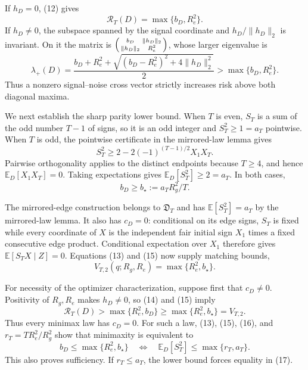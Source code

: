 If \(h_D=0\), (12) gives
\[
\mathcal R_T(D)=\max\{b_D,R_e^2\}.
\tag{13}
\]
If \(h_D\ne0\), the subspace spanned by the signal coordinate and \(h_D/\lVert h_D\rVert_2\) is invariant.  On it the matrix is
\(
\begin{psmallmatrix}b_D&\lVert h_D\rVert_2\\\lVert h_D\rVert_2&R_e^2\end{psmallmatrix}
\), whose larger eigenvalue is
\[
\lambda_+(D)=
\frac{b_D+R_e^2+\sqrt{(b_D-R_e^2)^2+4\lVert h_D\rVert_2^2}}{2}
>\max\{b_D,R_e^2\}.
\tag{14}
\]
Thus a nonzero signal--noise cross vector strictly increases risk above both diagonal maxima.

We next establish the sharp parity lower bound.  When \(T\) is even, \(S_T\) is a sum of the odd number \(T-1\) of signs, so it is an odd integer and \(S_T^2\ge1=a_T\) pointwise.  When \(T\) is odd, the pointwise certificate in the mirrored-law lemma gives
\[
S_T^2\ge2-2(-1)^{(T-1)/2}X_1X_T.
\]
Pairwise orthogonality applies to the distinct endpoints because \(T\ge4\), and hence \(\mathbb E_D[X_1X_T]=0\).  Taking expectations gives \(\mathbb E_D[S_T^2]\ge2=a_T\).  In both cases,
\[
b_D\ge b_\star:=a_TR_g^2/T.
\tag{15}
\]

The mirrored-edge construction belongs to \(\mathfrak D_T\) and has \(\mathbb E[S_T^2]=a_T\) by the mirrored-law lemma.  It also has \(c_D=0\): conditional on its edge signs, \(S_T\) is fixed while every coordinate of \(X\) is the independent fair initial sign \(X_1\) times a fixed consecutive edge product.  Conditional expectation over \(X_1\) therefore gives \(\mathbb E[S_TX\mid Z]=0\).  Equations (13) and (15) now supply matching bounds,
\[
V_{T,2}(q;R_g,R_e)=\max\{R_e^2,b_\star\}.
\tag{16}
\]

For necessity of the optimizer characterization, suppose first that \(c_D\ne0\).  Positivity of \(R_g,R_e\) makes \(h_D\ne0\), so (14) and (15) imply
\[
\mathcal R_T(D)>\max\{R_e^2,b_D\}
\ge\max\{R_e^2,b_\star\}=V_{T,2}.
\]
Thus every minimax law has \(c_D=0\).  For such a law, (13), (15), (16), and \(r_T=TR_e^2/R_g^2\) show that minimaxity is equivalent to
\[
b_D\le\max\{R_e^2,b_\star\}
\quad\Longleftrightarrow\quad
\mathbb E_D[S_T^2]\le\max\{r_T,a_T\}.
\tag{17}
\]
This also proves sufficiency.  If \(r_T\le a_T\), the lower bound forces equality in (17).

